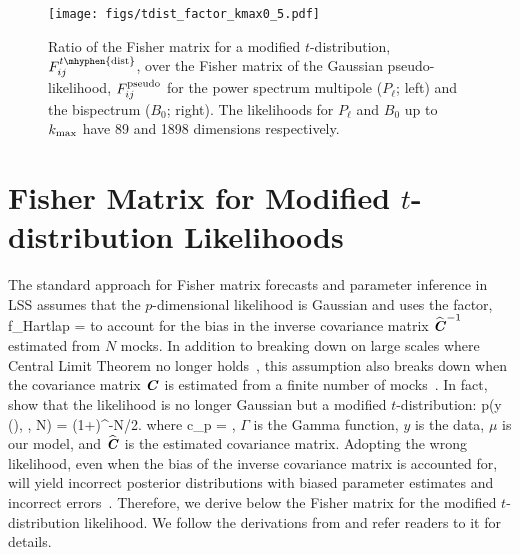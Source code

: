 \begin{figure}
\begin{center}
    \texttt{[image: figs/tdist\_factor\_kmax0\_5.pdf]} 
    \caption{Ratio of the Fisher matrix for a modified $t$-distribution, 
    $F^{t\mhyphen{\rm dist}}_{ij}$, over the Fisher matrix of the Gaussian 
    pseudo-likelihood, $F^{\rm pseudo}_{ij}$ for the power spectrum multipole 
    ($P_\ell$; left) and the bispectrum ($B_0$; right). The likelihoods for 
    $P_\ell$ and $B_0$ up to $k_{\rm max}$ have 89 and 1898 dimensions 
    respectively. 
    }
\label{fig:f_tdist}
\end{center}
\end{figure}


\section{Fisher Matrix for Modified $t$-distribution Likelihoods} \label{sec:tdist}
The standard approach for Fisher matrix forecasts and parameter inference in LSS 
assumes that the $p$-dimensional likelihood is Gaussian and uses the \cite{hartlap2007} 
factor, 
\beq
f_{\rm Hartlap} = 
\eeq
to account for the bias in the inverse covariance matrix $\widehat{\textbf{\textit{C}}}^{-1}$ 
estimated from $N$ mocks. In addition to breaking down on large scales where Central 
Limit Theorem no longer holds~\citep{hahn2019}, this assumption also breaks down 
when the covariance matrix $\textbf{\textit{C}}$ is estimated from a finite number of 
mocks~\citep{sellentin2016}. In fact, \cite{sellentin2016} show that the likelihood 
is no longer Gaussian but a modified $t$-distribution: 
\beq \label{eq:tdist_like}
p(y \given \mu(\theta), , N) = 
 \left(1+\right)^{-N/2}.
\eeq
where 
\beq
c_p = , 
\eeq
$\Gamma$ is the Gamma function, $y$ is the data, $\mu$ is our model, and 
$\widehat{\textbf{\textit{C}}}$ is the estimated covariance matrix. Adopting the wrong 
likelihood, even when the bias of the inverse covariance matrix is accounted 
for,  will yield incorrect posterior distributions with biased parameter 
estimates and incorrect errors~\citep{sellentin2016}. Therefore, we derive 
below the Fisher matrix for the modified $t$-distribution likelihood. We 
follow the derivations from \cite{lange1989} and refer readers to it for 
details. 

